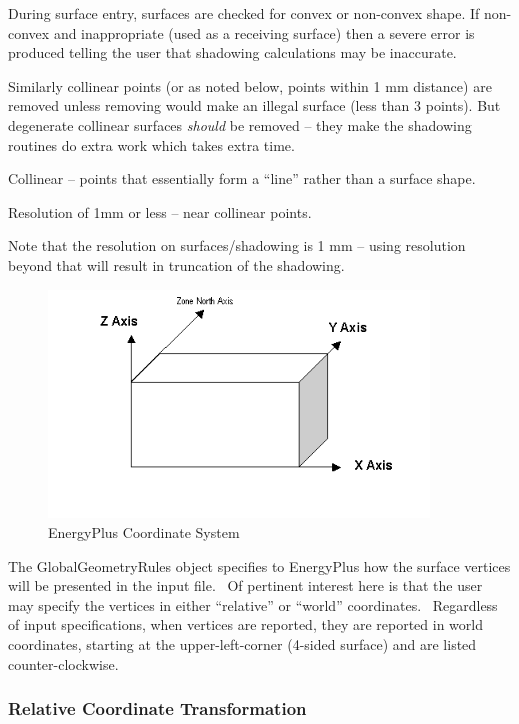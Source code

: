 During surface entry, surfaces are checked for convex or non-convex shape. If non-convex and inappropriate (used as a receiving surface) then a severe error is produced telling the user that shadowing calculations may be inaccurate.

Similarly collinear points (or as noted below, points within 1 mm distance) are removed unless removing would make an illegal surface (less than 3 points). But degenerate collinear surfaces \emph{should} be removed -- they make the shadowing routines do extra work which takes extra time.

Collinear -- points that essentially form a ``line'' rather than a surface shape.

Resolution of 1mm or less -- near collinear points.

Note that the resolution on surfaces/shadowing is 1 mm -- using resolution beyond that will result in truncation of the shadowing.

\begin{figure}[hbtp] %
\centering
\includegraphics[width=0.9\textwidth, height=0.9\textheight, keepaspectratio=true]{media/image605.png}
\caption{  EnergyPlus Coordinate System \protect \label{fig:energyplus-coordinate-system}}
\end{figure}

The GlobalGeometryRules object specifies to EnergyPlus how the surface vertices will be presented in the input file.~ Of pertinent interest here is that the user may specify the vertices in either ``relative'' or ``world'' coordinates.~ Regardless of input specifications, when vertices are reported, they are reported in world coordinates, starting at the upper-left-corner (4-sided surface) and are listed counter-clockwise.

\subsubsection{Relative Coordinate Transformation}\label{relative-coordinate-transformation}


